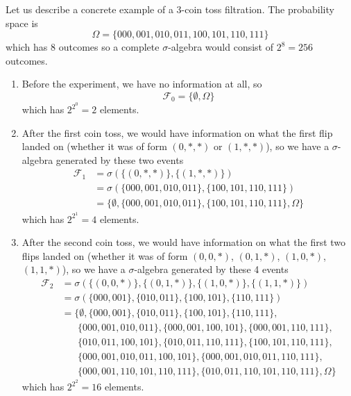     \begin{example}
      Let us describe a concrete example of a 3-coin toss filtration. The probability space is 
      \begin{equation}
        \Omega = \{000, 001, 010, 011, 100, 101, 110, 111\}
      \end{equation}
      which has $8$ outcomes so a complete $\sigma$-algebra would consist of $2^8 = 256$ outcomes. 
      \begin{enumerate}
        \item Before the experiment, we have no information at all, so 
        \begin{equation}
          \mathcal{F}_0 = \{\emptyset, \Omega\}
        \end{equation}
        which has $2^{2^0} = 2$ elements. 
        
        \item After the first coin toss, we would have information on what the first flip landed on (whether it was of form $( 0, \ast, \ast)$ or $(1, \ast, \ast)$), so we have a $\sigma$-algebra generated by these two events 
        \begin{align*}
          \mathcal{F}_1 & = \sigma(\{( 0, \ast, \ast)\}, \{(1, \ast, \ast)\}) \\
          & = \sigma(\{000, 001, 010, 011\}, \{100, 101, 110, 111\}) \\
          & = \{\emptyset, \{000, 001, 010, 011\}, \{100, 101, 110, 111\}, \Omega\}
        \end{align*}
        which has $2^{2^1} = 4$ elements. 
        
        \item After the second coin toss, we would have information on what the first two flips landed on (whether it was of form $( 0, 0, \ast)$, $( 0, 1, \ast)$, $(1, 0, \ast)$, $(1, 1, \ast)$), so we have a $\sigma$-algebra generated by these 4 events 
        \begin{align}
          \mathcal{F}_2 & = \sigma(\{( 0, 0, \ast)\}, \{( 0, 1, \ast)\}, \{(1, 0, \ast)\}, \{(1, 1, \ast)\}) \\
          & = \sigma(\{000, 001\}, \{010, 011\}, \{100, 101\}, \{110, 111\}) \\
          & = \{\emptyset, \{000, 001\}, \{010, 011\}, \{100, 101\}, \{110, 111\}, \\
          & \;\;\;\;\;\; \{000, 001, 010, 011\}, \{000, 001, 100, 101\}, \{000, 001, 110, 111\}, \\
          & \;\;\;\;\;\; \{010, 011, 100, 101\}, \{010, 011, 110, 111\}, \{100, 101, 110, 111\}, \\ 
          & \;\;\;\;\;\; \{000, 001, 010, 011, 100, 101\}, \{000, 001, 010, 011, 110, 111\}, \\
          & \;\;\;\;\;\; \{000, 001, 110, 101, 110, 111\}, \{010, 011, 110, 101, 110, 111\},  \Omega\}
        \end{align}
        which has $2^{2^2} = 16$ elements. 
        

\end{enumerate}
\end{example}
